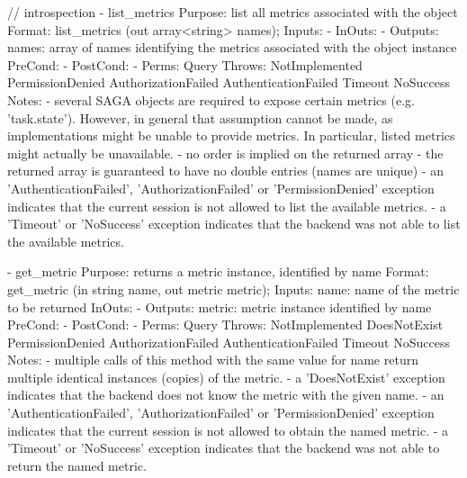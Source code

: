  
 \begin{myspec}
    // introspection
    - list_metrics
      Purpose:  list all metrics associated with the object
      Format:   list_metrics       (out array<string>   names);
      Inputs:   -
      InOuts:   -
      Outputs:  names:              array of names identifying
                                    the metrics associated with
                                    the object instance
      PreCond:  -
      PostCond: -
      Perms:    Query
      Throws:   NotImplemented
                PermissionDenied
                AuthorizationFailed
                AuthenticationFailed
                Timeout
                NoSuccess
      Notes:    - several SAGA objects are required to expose
                  certain metrics (e.g. 'task.state').  However,
                  in general that assumption cannot be made, as
                  implementations might be unable to provide
                  metrics.  In particular, listed metrics might
                  actually be unavailable.
                - no order is implied on the returned array
                - the returned array is guaranteed to have no
                  double entries (names are unique)
                - an 'AuthenticationFailed', 
                  'AuthorizationFailed' or 'PermissionDenied'
                  exception indicates that the current session
                  is not allowed to list the available metrics.
                - a 'Timeout' or 'NoSuccess' exception indicates
                  that the backend was not able to list the
                  available metrics.
 
 
    - get_metric
      Purpose:  returns a metric instance, identified by name
      Format:   get_metric         (in  string  name,
                                    out metric  metric);
      Inputs:   name:               name of the metric to be
                                    returned
      InOuts:   -
      Outputs:  metric:             metric instance identified 
                                    by name
      PreCond:  -
      PostCond: -
      Perms:    Query
      Throws:   NotImplemented
                DoesNotExist
                PermissionDenied
                AuthorizationFailed
                AuthenticationFailed
                Timeout
                NoSuccess
      Notes:    - multiple calls of this method with the same
                  value for name return multiple identical
                  instances (copies) of the metric.
                - a 'DoesNotExist' exception indicates that the
                  backend does not know the metric with the
                  given name.
                - an 'AuthenticationFailed', 
                  'AuthorizationFailed' or 'PermissionDenied'
                  exception indicates that the current session
                  is not allowed to obtain the named metric.
                - a 'Timeout' or 'NoSuccess' exception indicates
                  that the backend was not able to return the
                  named metric.
 

\end{myspec}

